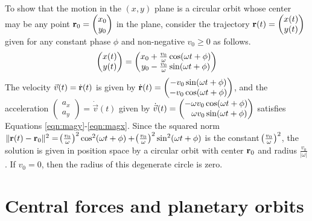 \begin{answer}
	To show that the motion in the $(x,y)$ plane is a circular orbit whose center may be any point $\mathbf{r}_0 = \begin{pmatrix} x_0 \\ y_0 \end{pmatrix}$ in the plane, consider the trajectory $\mathbf{r}(t) = \begin{pmatrix} x(t) \\ y(t) \end{pmatrix}$ given for any constant phase $\phi$ and non-negative $v_0 \geq 0$ as follows.
	\begin{align*}
		\begin{pmatrix}
			x(t) \\
			y(t)
		\end{pmatrix}
		=
		\begin{pmatrix}
			x_0 + \frac{v_0}{\omega} \cos\!\left(\omega t + \phi\right) \\
			y_0 - \frac{v_0}{\omega} \sin\!\left(\omega t + \phi\right)
		\end{pmatrix}
	\end{align*}
	The velocity $\vec{v}(t) = \dot{\mathbf{r}}(t)$ is given by $\dot{\mathbf{r}}(t) = \begin{pmatrix} - v_0 \sin\!\left(\omega t + \phi\right) \\ - v_0 \cos\!\left(\omega t + \phi\right) \end{pmatrix}$, and the acceleration $\begin{pmatrix} a_x \\ a_y \end{pmatrix} = \dot{\vec{v}}(t)$ given by $\dot{\vec{v}}(t) = \begin{pmatrix} - \omega v_0 \cos\!\left(\omega t + \phi\right) \\ \phantom{+} \omega v_0 \sin\!\left(\omega t + \phi\right) \end{pmatrix}$ satisfies Equations \eqref{eqn:magy}-\eqref{eqn:magx}.
	Since the squared norm $\|\mathbf{r}(t) - \mathbf{r}_0\|^2 = \!\left(\frac{v_0}{\omega}\right)^2 \cos^2\!\left(\omega t + \phi\right) + \!\left(\frac{v_0}{\omega}\right)^2 \sin^2\!\left(\omega t + \phi\right)$ is the constant $\!\left(\frac{v_0}{\omega}\right)^2$, the solution is given in position space by a circular orbit with center $\mathbf{r}_0$ and radius $\frac{v_0}{\left|\omega\right|}$.
	If $v_0 = 0$, then the radius of this degenerate circle is zero.
\end{answer}

\section{Central forces and planetary orbits}

